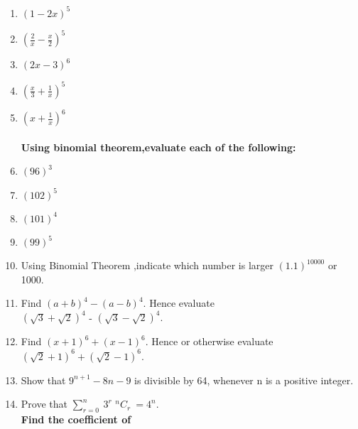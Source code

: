 %
%
%
%
\renewcommand{\theequation}{\theenumi}
\begin{enumerate}[label=\arabic*.,ref=\thesubsection.\theenumi]
\item $(1-2x)^5$\\
\item $(\frac{2}{x} - \frac{x}{2})^5$\\
\item $(2x - 3)^6$\\
\item $(\frac{x}{3} + \frac{1}{x})^5$\\
\item $(x + \frac{1}{x})^6$\\
\\


\textbf{Using binomial theorem,evaluate each of the following:}\\

\item $(96)^3$\\
\item $(102)^5$\\
\item $(101)^4$\\
\item $(99)^5$\\

\item Using Binomial Theorem ,indicate which number is larger $(1.1)^{10000}$ or 1000.\\
\item Find $(a+b)^4 - (a-b)^4.$ Hence evaluate \\
$(\sqrt{3} + \sqrt{2})^4$ - $(\sqrt{3} - \sqrt{2})^4.$\\
\item Find $(x + 1)^6 + (x - 1)^6.$ Hence or otherwise evaluate $(\sqrt{2} + 1)^6 + (\sqrt{2} - 1)^6.$\\
\item Show that $9^{n+1} - 8n - 9$ is divisible by 64, whenever n is a positive integer.\\
\item Prove that $ \sum \limits_{r=0}^{n}\ 3^r$ $ ^nC_r\ = 4 ^n$.\\






\textbf{Find the coefficient of}\\



\end{enumerate}
